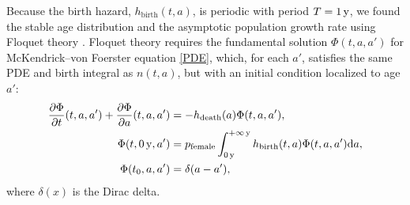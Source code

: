 \documentclass[12pt, UKenglish]{article}  %
\newcommand{\md}{\mathrm{d}}
\begin{document}
Because the birth hazard, $h_{\text{birth}}(t, a)$,
is periodic with period $T = \unit[1]{y}$,
we found the stable age distribution and the asymptotic population
growth rate using Floquet theory \autocite{parker_1992}.  Floquet
theory requires the fundamental solution $\Phi(t, a, a')$
for McKendrick--von Foerster equation \eqref{PDE}, which, for each
$a'$,
satisfies the same PDE and birth integral as $n(t, a)$,
but with an initial condition localized to age $a'$:
\begin{equation}
  \label{fundamental_PDE}
  \begin{split}
    \frac{\partial \Phi}{\partial t}(t, a, a')
    + \frac{\partial \Phi}{\partial a}(t, a, a')
    &= - h_{\text{death}}(a) \Phi(t, a, a'),
    \\
    \Phi(t, \unit[0]{y}, a') &=
    p_{\text{female}}
    \int_{\unit[0]{y}}^{\unit[+\infty]{y}}
    h_{\text{birth}}(t, a) \Phi(t, a, a') \md a,
    \\
    \Phi(t_0, a, a') &= \delta(a - a'),
  \end{split}
\end{equation}
where $\delta(x)$ is the Dirac delta.
\end{document}
